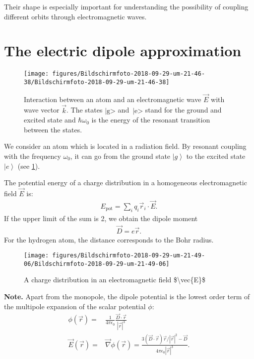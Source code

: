 \documentclass[10pt]{article}
\newcommand{\ket}[1]{\ensuremath{\left|#1\right\rangle}}
\begin{document}
Their shape is especially important for understanding the possibility of coupling different orbits through electromagnetic waves.





\section{The electric dipole approximation}
\begin{figure}[h!]
\begin{center}
\texttt{[image: figures/Bildschirmfoto-2018-09-29-um-21-46-38/Bildschirmfoto-2018-09-29-um-21-46-38]}
\caption{{Interaction between an atom and an electromagnetic wave
\(\vec{E}\) with wave vector \(\vec{k}\). The states
\(\text{|g>}\) and~\(\text{|e>}\) stand for the ground and
excited state and \(\hbar\omega_0\) is the energy of the resonant
transition between the states.
{\label{823292}}%
}}
\end{center}
\end{figure}



We consider an atom which is located in a radiation field.
By resonant coupling with the frequency $\omega_0$, it can go from the ground state $\ket{g}$ to the excited state $\ket{e}$ (see \ref{823292}).

The potential energy of a charge distribution in a homogeneous electromagnetic field $\vec{E}$ is:
\begin{align}
E_\text{pot} = \sum_i q_i \vec{r}_i\cdot \vec{E}.
\end{align}
If the upper limit of the sum is 2, we obtain the dipole moment
\begin{align}
\vec{D} = e \vec{r}.
\end{align}
For the hydrogen atom, the distance corresponds to the Bohr radius.
\begin{figure}[h!]
\begin{center}
\texttt{[image: figures/Bildschirmfoto-2018-09-29-um-21-49-06/Bildschirmfoto-2018-09-29-um-21-49-06]}
\caption{{A charge distribution in an electromagnetic field
\$\textbackslash{}vec\{E\}\$
{\label{241421}}%
}}
\end{center}
\end{figure}

\textbf{Note.} Apart from the monopole, the dipole potential is the lowest order term of the multipole expansion of the scalar potential $\phi$:
\begin{align}
\phi \left( \vec{r} \right) =& \frac{1}{4\pi\epsilon_0}\frac{\vec{D}\cdot\vec{r}}{|\vec{r}|^3}\\
\vec{E}(\vec{r})=& \vec{\nabla}\phi(\vec{r}) = \frac{ 3 \left(\vec{D}\cdot \vec{r}\right) \vec{r}/{|\vec{r}|^2}- \vec{D}}{4\pi\epsilon_0|\vec{r}|^3}.
\end{align}
\end{document}

